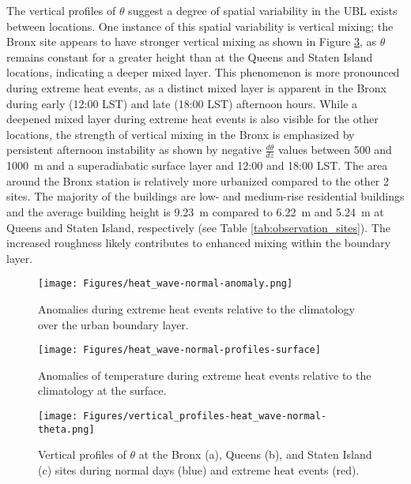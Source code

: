 The vertical profiles of $\theta$ suggest a degree of spatial variability in the UBL exists between locations. One instance of this spatial variability is vertical mixing; the Bronx site appears to have stronger vertical mixing as shown in Figure \ref{fig:vertical_profiles-heat_wave-normal-theta}, as $\theta$ remains constant for a greater height than at the Queens and Staten Island locations, indicating a deeper mixed layer. This phenomenon is more pronounced during extreme heat events, as a distinct mixed layer is apparent in the Bronx during early (12:00 LST) and late (18:00 LST) afternoon hours. While a deepened mixed layer during extreme heat events is also visible for the other locations, the strength of vertical mixing in the Bronx is emphasized by persistent afternoon instability as shown by negative $\frac{d\theta}{dz}$ values between 500 and \SI{1000}{\meter} and a superadiabatic surface layer and 12:00 and 18:00 LST. The area around the Bronx station is relatively more urbanized compared to the other 2 sites. The majority of the buildings are low- and medium-rise residential buildings and the average building height is \SI{9.23}{\meter} compared to \SI{6.22}{\meter} and  \SI{5.24}{\meter} at Queens and Staten Island, respectively (see Table \ref{tab:observation_sites}). The increased roughness likely contributes to enhanced mixing within the boundary layer.

\begin{figure}[ht]
	\centering
	\texttt{[image: Figures/heat\_wave-normal-anomaly.png]}
	\caption{Anomalies during extreme heat events relative to the climatology over the urban boundary layer.}
	\label{fig:extreme-heat-normal-comparison-contours}
\end{figure}

\begin{figure}[ht]
	\centering
	\texttt{[image: Figures/heat\_wave-normal-profiles-surface]}
	\caption{Anomalies of temperature during extreme heat events relative to the climatology at the surface.}
	\label{fig:extreme-heat-normal-comparison-surface}
\end{figure}

\begin{figure}[ht]
	\centering
	\texttt{[image: Figures/vertical\_profiles-heat\_wave-normal-theta.png]}
	\caption{Vertical profiles of $\theta$ at the Bronx (a), Queens (b), and Staten Island (c) sites during normal days (blue) and extreme heat events (red).}
	\label{fig:vertical_profiles-heat_wave-normal-theta}
\end{figure}

